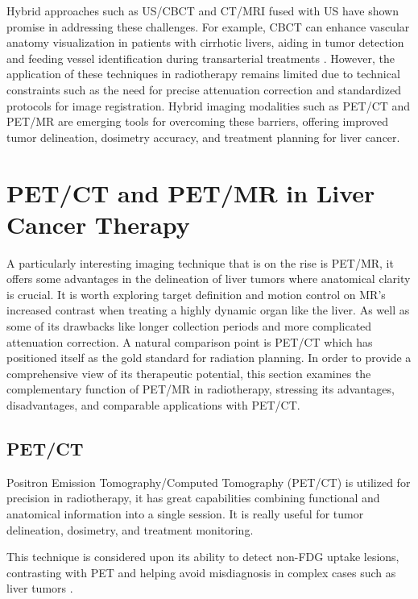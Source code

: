\documentclass[11pt]{article} %
\begin{document}
\begin{multicols}{2}
Hybrid approaches such as US/CBCT and CT/MRI fused with US have shown promise in addressing these challenges. For example, CBCT can enhance vascular anatomy visualization in patients with cirrhotic livers, aiding in tumor detection and feeding vessel identification during transarterial treatments \cite{floridi2022}. However, the application of these techniques in radiotherapy remains limited due to technical constraints such as the need for precise attenuation correction and standardized protocols for image registration. Hybrid imaging modalities such as PET/CT and PET/MR are emerging tools for overcoming these barriers, offering improved tumor delineation, dosimetry accuracy, and treatment planning for liver cancer. %


\section{PET/CT and PET/MR in Liver Cancer Therapy}

A particularly interesting imaging technique that is on the rise is PET/MR, it offers some advantages in the delineation of liver tumors where anatomical clarity is crucial. It is worth exploring target definition and motion control on MR's increased contrast when treating a highly dynamic organ like the liver. As well as some of its drawbacks like longer collection periods and more complicated attenuation correction. A natural comparison point is PET/CT which has positioned itself as the gold standard for radiation planning. In order to provide a comprehensive view of its therapeutic potential, this section examines the complementary function of PET/MR in radiotherapy, stressing its advantages, disadvantages, and comparable applications with PET/CT.

\subsection{PET/CT}
Positron Emission Tomography/Computed Tomography (PET/CT) is utilized for precision in radiotherapy, it has great capabilities combining functional and anatomical information into a single session. It is really useful for tumor delineation, dosimetry, and treatment monitoring.

This technique is considered upon its ability to detect non-FDG uptake lesions, contrasting with PET and helping avoid misdiagnosis in complex cases such as liver tumors \cite{yan2024, decazes2021}.



\end{multicols}
\end{document}
